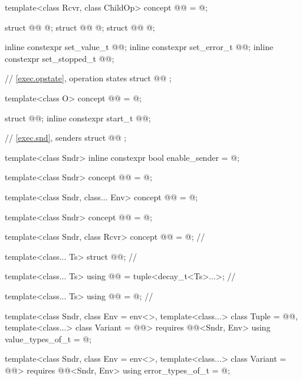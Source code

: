 \begin{codeblock}
{  template<class Rcvr, class ChildOp>
    concept @@ = @\seebelow@;

  struct @@ { @\unspec@ };
  struct @@ { @\unspec@ };
  struct @@ { @\unspec@ };

  inline constexpr set_value_t @@{};
  inline constexpr set_error_t @@{};
  inline constexpr set_stopped_t @@{};

  // \ref{exec.opstate}, operation states
  struct @@ {};

  template<class O>
    concept @@ = @\seebelow@;

  struct @@;
  inline constexpr start_t @@{};

  // \ref{exec.snd}, senders
  struct @@ {};

  template<class Sndr>
    inline constexpr bool enable_sender = @\seebelow@;

  template<class Sndr>
    concept @@ = @\seebelow@;

  template<class Sndr, class... Env>
    concept @@ = @\seebelow@;

  template<class Sndr>
    concept @@ = @\seebelow@;

  template<class Sndr, class Rcvr>
    concept @@ = @\seebelownc@;                              // \expos

  template<class... Ts>
    struct @@;                                           // \expos

  template<class... Ts>
    using @@ = tuple<decay_t<Ts>...>;                // \expos

  template<class... Ts>
    using @@ = @\seebelownc@;                         // \expos

  template<class Sndr, class Env = env<>,
           template<class...> class Tuple = @@,
           template<class...> class Variant = @@>
    requires @@<Sndr, Env>
    using value_types_of_t = @\seebelow@;

  template<class Sndr, class Env = env<>,
           template<class...> class Variant = @@>
    requires @@<Sndr, Env>
    using error_types_of_t = @\seebelow@;

}
\end{codeblock}
